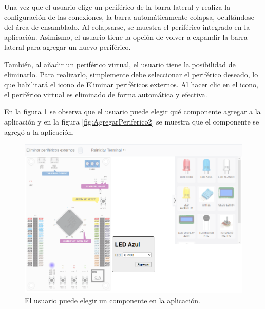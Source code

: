 Una vez que el usuario elige un periférico de la barra lateral y realiza la configuración de las conexiones, la barra automáticamente colapsa, ocultándose del área de ensamblado. Al colapsarse, se muestra el periférico integrado en la aplicación. Asimismo,  el usuario tiene la opción de volver a expandir la barra lateral para agregar un nuevo periférico.

También, al añadir un periférico virtual, el usuario tiene la posibilidad de eliminarlo. Para realizarlo, simplemente debe seleccionar el periférico deseado, lo que habilitará el icono de \textquotedbl Eliminar periféricos externos\textquotedbl. Al hacer clic en el icono, el periférico virtual es eliminado de forma automática y efectiva.

En la figura \ref{fig:AgregarPeriferico} se observa que el usuario puede elegir qué componente agregar a la aplicación y en la figura \ref{fig:AgregarPeriferico2} se muestra que el componente se agregó a la aplicación.

\begin{figure}[ht]
	\centering
	\includegraphics[scale=.37]{./Figures/AgregarPeriferico.png}
	\caption{El usuario puede elegir un componente en la aplicación.}
	\label{fig:AgregarPeriferico}
\end{figure}

